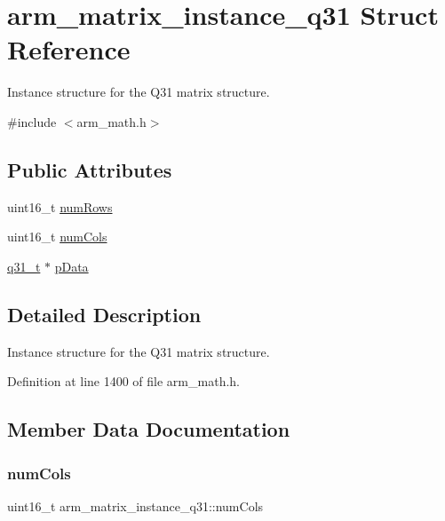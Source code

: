 \hypertarget{structarm__matrix__instance__q31}{}\section{arm\+\_\+matrix\+\_\+instance\+\_\+q31 Struct Reference}
\label{structarm__matrix__instance__q31}


Instance structure for the Q31 matrix structure.  




{\ttfamily \#include $<$arm\+\_\+math.\+h$>$}

\subsection*{Public Attributes}
\begin{DoxyCompactItemize}
\item 
uint16\+\_\+t \hyperlink{structarm__matrix__instance__q31_a63bacac158a821c8cfc06088d251598c}{num\+Rows}
\item 
uint16\+\_\+t \hyperlink{structarm__matrix__instance__q31_abd161da7614eda927157f18b698074b1}{num\+Cols}
\item 
\hyperlink{arm__math_8h_adc89a3547f5324b7b3b95adec3806bc0}{q31\+\_\+t} $\ast$ \hyperlink{structarm__matrix__instance__q31_a09a64267c0579fef086efc9059741e56}{p\+Data}
\end{DoxyCompactItemize}


\subsection{Detailed Description}
Instance structure for the Q31 matrix structure. 

Definition at line 1400 of file arm\+\_\+math.\+h.



\subsection{Member Data Documentation}
\mbox{\label{structarm__matrix__instance__q31_abd161da7614eda927157f18b698074b1}} 
\subsubsection{\texorpdfstring{num\+Cols}{numCols}}
{\footnotesize\ttfamily uint16\+\_\+t arm\+\_\+matrix\+\_\+instance\+\_\+q31\+::num\+Cols}

